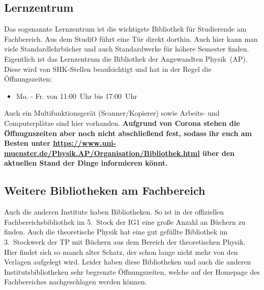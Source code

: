 \begin{multicols*}{2}
\subsection{Lernzentrum}
Das sogenannte Lernzentrum ist die wichtigste Bibliothek für Studierende am Fachbereich.
Aus dem StudiO führt eine Tür direkt dorthin.
Auch hier kann man viele Standardlehrbücher und auch Standardwerke für höhere Semester finden.
Eigentlich ist das Lernzentrum die Bibliothek der Angewandten Physik~(AP).
Diese wird von SHK-Stellen beaufsichtigt und hat in der Regel die Öffnungszeiten:
\begin{itemize}
	\item Mo. - Fr. von 11:00~Uhr bis 17:00~Uhr 
\end{itemize}
Auch ein Multifunktionsgerät (Scanner/Kopierer) sowie Arbeits- und Computerplätze sind hier vorhanden.
\textbf{Aufgrund von Corona stehen die Öffnugnszeiten aber noch nicht abschließend fest, sodass ihr euch am Besten unter \url{https://www.uni-muenster.de/Physik.AP/Organisation/Bibliothek.html} über den aktuellen Stand der Dinge informieren könnt.}

\begin{center}
\end{center}

\subsection{Weitere Bibliotheken am Fachbereich}
Auch die anderen Institute haben Bibliotheken.
So ist in der offiziellen Fachbereichsbibliothek im 5.~Stock der IG1 eine große Anzahl an Büchern zu finden.
Auch die theoretische Physik hat eine gut gefüllte Bibliothek im 3.~Stockwerk der TP mit Büchern aus dem Bereich der theoretischen Physik.
Hier findet sich so manch alter Schatz, der schon lange nicht mehr von den Verlagen aufgelegt wird.
Leider haben diese Bibliotheken und auch die anderen Institutsbibliotheken sehr begrenzte Öffnungszeiten, welche auf der Homepage des Fachbereiches nachgeschlagen werden können.



\end{multicols*}
